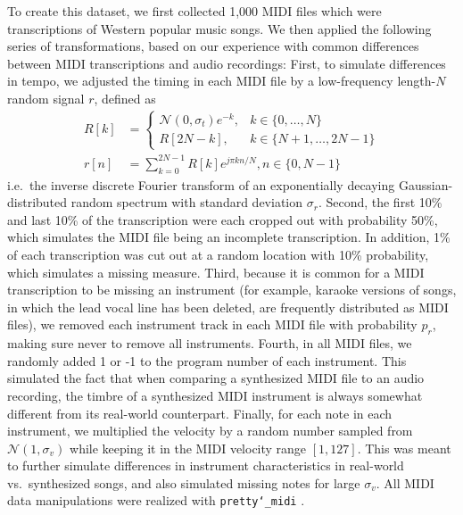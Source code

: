 \documentclass{article}
\begin{document}
To create this dataset, we first collected 1,000 MIDI files which were transcriptions of Western popular music songs.
We then applied the following series of transformations, based on our experience with common differences between MIDI transcriptions and audio recordings:
First, to simulate differences in tempo, we adjusted the timing in each MIDI file by a low-frequency length-$N$ random signal $r$, defined as
\begin{align*}
R[k] &= \begin{cases}
\mathcal{N}(0, \sigma_t) e^{-k}, &k \in \{0, \ldots, N\}\\
R[2N - k], &k \in \{N + 1, \ldots, 2N - 1\}
\end{cases}\\
r[n] &= \sum_{k = 0}^{2N - 1} R[k]e^{j\pi kn/N}, n \in \{0, N - 1\}
\end{align*}
i.e.\ the inverse discrete Fourier transform of an exponentially decaying Gaussian-distributed random spectrum with standard deviation $\sigma_r$.
Second, the first 10\% and last 10\% of the transcription were each cropped out with probability 50\%, which simulates the MIDI file being an incomplete transcription.
In addition, 1\% of each transcription was cut out at a random location with 10\% probability, which simulates a missing measure.
Third, because it is common for a MIDI transcription to be missing an instrument (for example, karaoke versions of songs, in which the lead vocal line has been deleted, are frequently distributed as MIDI files), we removed each instrument track in each MIDI file with probability $p_r$, making sure never to remove all instruments.
Fourth, in all MIDI files, we randomly added 1 or -1 to the program number of each instrument.
This simulated the fact that when comparing a synthesized MIDI file to an audio recording, the timbre of a synthesized MIDI instrument is always somewhat different from its real-world counterpart.
Finally, for each note in each instrument, we multiplied the velocity by a random number sampled from $\mathcal{N}(1, \sigma_v)$ while keeping it in the MIDI velocity range $[1, 127]$.
This was meant to further simulate differences in instrument characteristics in real-world vs.\ synthesized songs, and also simulated missing notes for large $\sigma_v$.
All MIDI data manipulations were realized with \texttt{pretty\char`_midi} \cite{raffel2014pretty_midi}.
\end{document}
